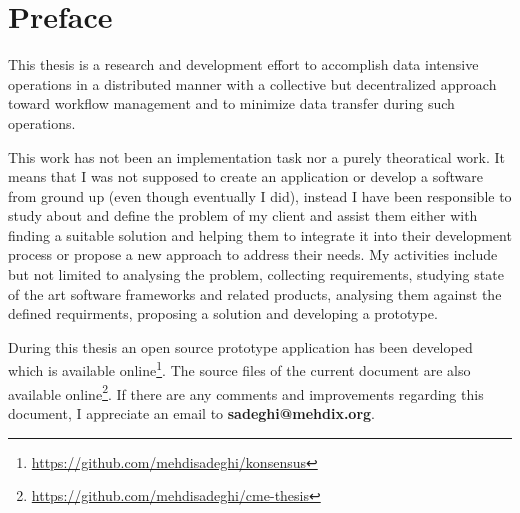 \chapter*{Preface}
\label{cha:preface}
This thesis is a research and development effort to accomplish data intensive operations in a distributed manner with a 
collective but decentralized approach toward workflow management and to minimize data transfer during such operations.

This work has not been an implementation task nor a purely theoratical work. 
It means that I was not supposed to create an application or develop a software from ground up (even though eventually I did), instead
I have been responsible to study about and define the problem of my client and assist them either with 
finding a suitable solution and helping them to integrate it into their development process or propose a new approach to address their 
needs. My activities include but not limited to analysing the problem, collecting requirements,
studying state of the art software frameworks and related products,
analysing them against the defined requirments, proposing a solution and developing a prototype.

During this thesis an open source prototype application has been developed which is available
online\footnote{\url{https://github.com/mehdisadeghi/konsensus}}. The source files
of the current document are also available online\footnote{\url{https://github.com/mehdisadeghi/cme-thesis}}.
If there are any comments and improvements regarding this document, I
appreciate an email to \textbf{sadeghi@mehdix.org}.

